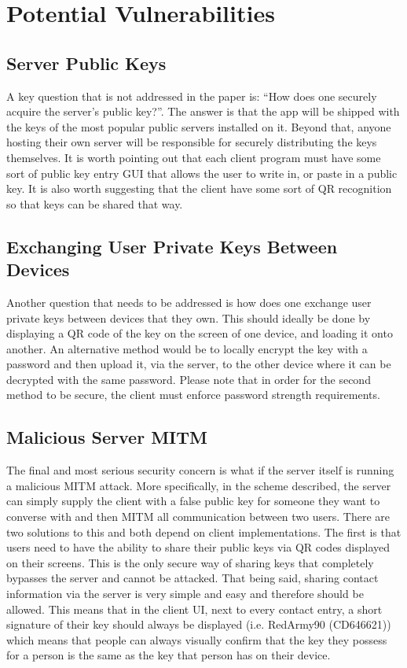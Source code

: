 \documentclass{article}
\begin{document}
\section{Potential Vulnerabilities}

\subsection{Server Public Keys}

A key question that is not addressed in the paper is: ``How does one securely acquire the server's public key?''. The answer is that the app will be shipped with the keys of the most popular public servers installed on it. Beyond that, anyone hosting their own server will be responsible for securely distributing the keys themselves. It is worth pointing out that each client program must have some sort of public key entry GUI that allows the user to write in, or paste in a public key. It is also worth suggesting that the client have some sort of QR recognition so that keys can be shared that way.

\subsection{Exchanging User Private Keys Between Devices}

Another question that needs to be addressed is how does one exchange user private keys between devices that they own. This should ideally be done by displaying a QR code of the key on the screen of one device, and loading it onto another. An alternative method would be to locally encrypt the key with a password and then upload it, via the server, to the other device where it can be decrypted with the same password. Please note that in order for the second method to be secure, the client must enforce password strength requirements.

\subsection{Malicious Server MITM}

The final and most serious security concern is what if the server itself is running a malicious MITM attack. More specifically, in the scheme described, the server can simply supply the client with a false public key for someone they want to converse with and then MITM all communication between two users. There are two solutions to this and both depend on client implementations. The first is that users need to have the ability to share their public keys via QR codes displayed on their screens. This is the only secure way of sharing keys that completely bypasses the server and cannot be attacked. That being said, sharing contact information via the server is very simple and easy and therefore should be allowed. This means that in the client UI, next to every contact entry, a short signature of their key should always be displayed (i.e. RedArmy90 (CD646621)) which means that people can always visually confirm that the key they possess for a person is the same as the key that person has on their device.
\end{document}
